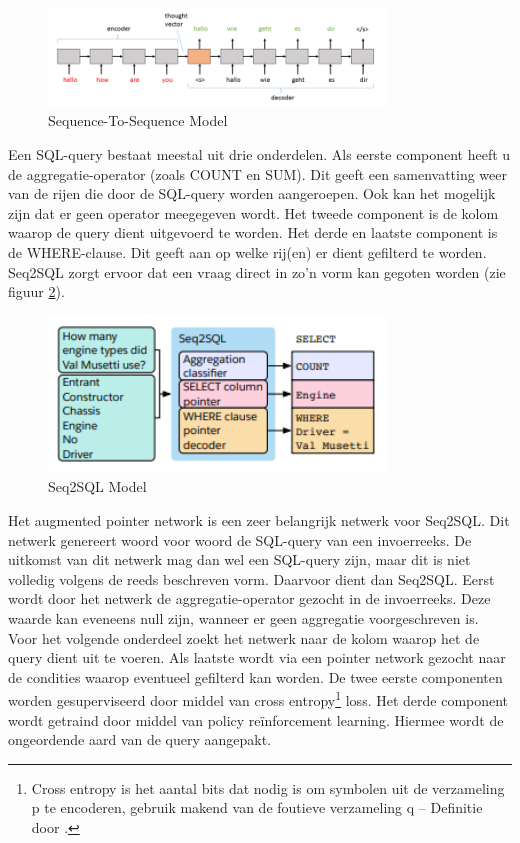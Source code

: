 \begin{figure}[ht]
	\centering
	\includegraphics[width=0.80\textwidth]{img/Seq2Seq}
	\caption[Sequence-To-Sequence Model]{Sequence-To-Sequence Model}
	\label{fig:seq2seq}
\end{figure}

Een SQL-query bestaat meestal uit drie onderdelen. Als eerste component heeft u de aggregatie-operator (zoals COUNT en SUM). Dit geeft een samenvatting weer van de rijen die door de SQL-query worden aangeroepen. Ook kan het mogelijk zijn dat er geen operator meegegeven wordt. Het tweede component is de kolom waarop de query dient uitgevoerd te worden. Het derde en laatste component is de WHERE-clause. Dit geeft aan op welke rij(en) er dient gefilterd te worden. Seq2SQL zorgt ervoor dat een vraag direct in zo’n vorm kan gegoten worden (zie figuur \ref{fig:seq2sql}).

\begin{figure}[ht]
	\centering
	\includegraphics[width=0.80\textwidth]{img/seq2sqlmodel}
	\caption[Seq2SQL Model]{Seq2SQL Model}
	\label{fig:seq2sql}
\end{figure}

Het augmented pointer network is een zeer belangrijk netwerk voor Seq2SQL. Dit netwerk genereert woord voor woord de SQL-query van een invoerreeks. De uitkomst van dit netwerk mag dan wel een SQL-query zijn, maar dit is niet volledig volgens de reeds beschreven vorm. Daarvoor dient dan Seq2SQL. Eerst wordt door het netwerk de aggregatie-operator gezocht in de invoerreeks. Deze waarde kan eveneens null zijn, wanneer er geen aggregatie voorgeschreven is. Voor het volgende onderdeel zoekt het netwerk naar de kolom waarop het de query dient uit te voeren. Als laatste wordt via een pointer network gezocht naar de condities waarop eventueel gefilterd kan worden. De twee eerste componenten worden gesuperviseerd door middel van cross entropy\footnote{Cross entropy is het aantal bits dat nodig is om symbolen uit de verzameling p te encoderen, gebruik makend van de foutieve verzameling q – Definitie door \textcite{rdp}.} loss. Het derde component wordt getraind door middel van policy reïnforcement learning. Hiermee wordt de ongeordende aard van de query aangepakt.

